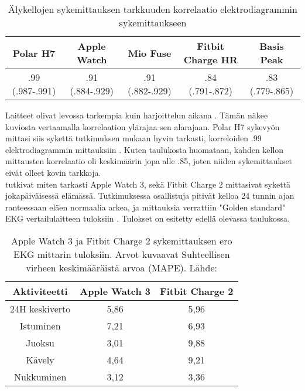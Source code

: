 \documentclass[utf8,bachelor,finnish]{bachelor}
\begin{document}
  \begin{table}[h]
    \begin{center}
      \begin{tabular}{||c c c c c||} 
       \hline
       Polar H7 & Apple Watch & Mio Fuse & Fitbit Charge HR & Basis Peak \\ [0.5ex] 
       \hline\hline
       .99 (.987-.991) & .91 (.884-.929) & .91 (.882-.929)& .84 (.791-.872)& .83 (.779-.865)\\
       \hline
      \end{tabular}
    \caption{Älykellojen sykemittauksen tarkkuuden korrelaatio elektrodiagrammin sykemittaukseen \parencite{wang_accuracy_2017}}
      \end{center}
    \end{table}

  Laitteet olivat levossa tarkempia kuin harjoittelun aikana \parencite{wang_accuracy_2017}. Tämän näkee kuviosta vertaamalla korrelaation ylärajaa sen alarajaan.
   Polar H7 sykevyön mittasi siis sykettä tutkimuksen mukaan hyvin tarkasti, korreloiden .99 elektrodiagrammin mittauksiin \parencite{wang_accuracy_2017}.
    Kuten taulukosta huomataan, kahden kellon mittausten korrelaatio oli keskimäärin jopa alle .85, joten niiden sykemittaukset eivät olleet kovin tarkkoja.\\
  
  \textcite{nelson_accuracy_2019} tutkivat miten tarkasti Apple Watch 3, sekä Fitbit Charge 2 mittasivat sykettä jokapäiväisessä elämässä.
   Tutkimuksessa osallistuja pitivät kelloa 24 tunnin ajan ranteessaan eläen normaalia arkea, ja mittauksia verrattiin
    "Golden standard" EKG vertailulaitteen tuloksiin \parencite{nelson_accuracy_2019}. Tulokset on esitetty edellä olevassa taulukossa.\\
    
    \begin{table}[H]
     \begin{center}
      \begin{tabular}{||c c c||}   
       \hline
       Aktiviteetti & Apple Watch 3 & Fitbit Charge 2\\ [0.5ex] 
       \hline\hline
       24H keskiverto & 5,86 & 5,96\\ 
       \hline
       Istuminen & 7,21 & 6,93\\ 
       \hline
       Juoksu & 3,01 & 9,88 \\
       \hline
       Kävely & 4,64 & 9,21\\
       \hline
       Nukkuminen & 3,12 & 3,36\\[1ex] 
       \hline
      \end{tabular}
    \caption{Apple Watch 3 ja Fitbit Charge 2 sykemittauksen ero EKG mittarin tuloksiin. Arvot kuvaavat Suhteellisen virheen keskimääräistä arvoa (MAPE). Lähde: \textcite{nelson_accuracy_2019}}
     \end{center} 
    \end{table}
\end{document}
